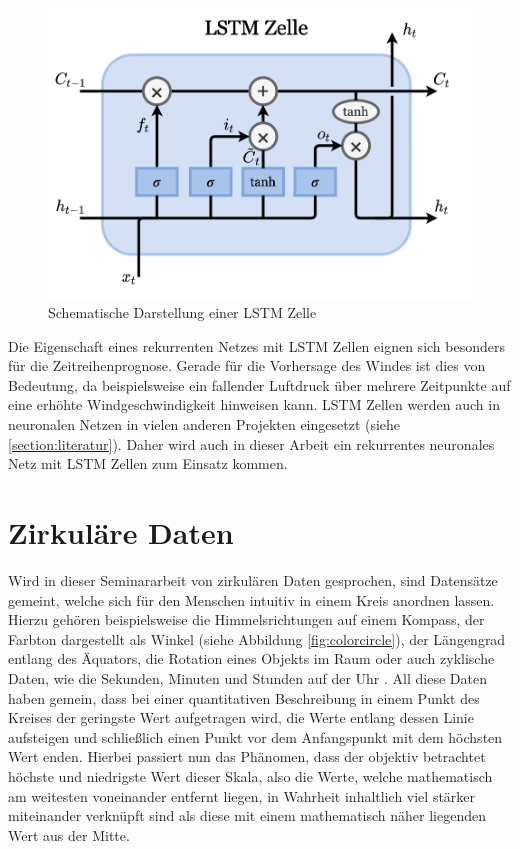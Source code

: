 \documentclass[
12pt, %
toc=listofnumbered, %
toc=chapterentrydotfill, %
numbers=noenddot, %
captions=tableheading, %
bibliography=numbered
]{scrreprt}
\let\Oldsection\section
\renewcommand{\section}{\FloatBarrier\Oldsection}
\begin{document}
\begin{figure}[tph]
	\begin{center}
		\includegraphics[width=0.5\linewidth]{./images/LSTM_Zelle.png}
		\caption{Schematische Darstellung einer LSTM Zelle}
		\label{fig:lstm}
	\end{center}
\end{figure}

Die Eigenschaft eines rekurrenten Netzes mit LSTM Zellen eignen sich besonders für die Zeitreihenprognose. Gerade für die Vorhersage des Windes ist dies von Bedeutung, da beispielsweise ein fallender Luftdruck über mehrere Zeitpunkte auf eine erhöhte Windgeschwindigkeit hinweisen kann. LSTM Zellen werden auch in neuronalen Netzen in vielen anderen Projekten eingesetzt (siehe \ref{section:literatur}). Daher wird auch in dieser Arbeit ein rekurrentes neuronales Netz mit LSTM Zellen zum Einsatz kommen.

\newpage

\section{Zirkuläre Daten}\label{section:circ_data}

Wird in dieser Seminararbeit von zirkulären Daten gesprochen, sind Datensätze gemeint, welche sich für den Menschen intuitiv in einem Kreis anordnen lassen. 
Hierzu gehören beispielsweise die Himmelsrichtungen auf einem Kompass, der Farbton dargestellt als Winkel (siehe Abbildung \ref{fig:colorcircle}), der Längengrad entlang des Äquators, die Rotation eines Objekts im Raum oder auch zyklische Daten, wie die Sekunden, Minuten und Stunden auf der Uhr \cite{2016_London_EncodingCyclicalContinuous}. 
All diese Daten haben gemein, dass bei einer quantitativen Beschreibung in einem Punkt des Kreises der geringste Wert aufgetragen wird, die Werte entlang dessen Linie aufsteigen und schließlich einen Punkt vor dem Anfangspunkt mit dem höchsten Wert enden. 
Hierbei passiert nun das Phänomen, dass der objektiv betrachtet höchste und niedrigste Wert dieser Skala, also die Werte, welche mathematisch am weitesten voneinander entfernt liegen, in Wahrheit inhaltlich viel stärker miteinander verknüpft sind als diese mit 
einem mathematisch näher liegenden Wert aus der Mitte. 
\end{document}
